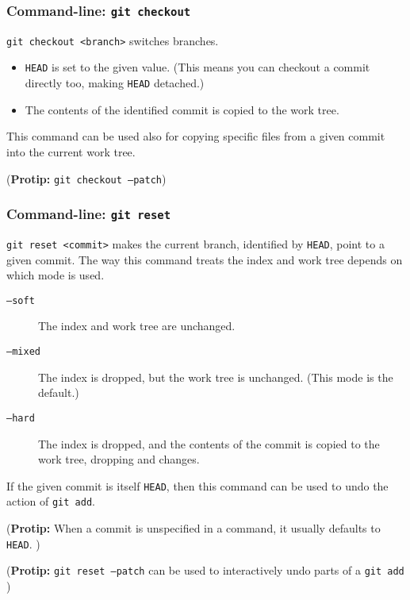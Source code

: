 \documentclass{beamer}
\newcommand{\HEAD}{\texttt{HEAD}}
\newcommand{\protip}[1]{(\textbf{Protip:} #1)}
\begin{document}
\begin{frame}
    \frametitle{Command-line: \texttt{git checkout}}

    \texttt{git checkout <branch>} switches branches.

    \begin{itemize}
        \item
            \HEAD{} is set to the given value.
            (This means you can checkout a commit directly too, making \HEAD{}
            detached.)
        \item
            The contents of the identified commit is copied to the work tree.
    \end{itemize}

    This command can be used also for copying specific files from a given
    commit into the current work tree.

    \protip{\texttt{git checkout --patch}}
\end{frame}

\begin{frame}
    \frametitle{Command-line: \texttt{git reset}}

    \texttt{git reset <commit>} makes the current branch, identified by
    \HEAD{}, point to a given commit. The way this command treats the index and
    work tree depends on which mode is used.

    \begin{description}
        \item[\texttt{--soft}]
            The index and work tree are unchanged.
        \item[\texttt{--mixed}]
            The index is dropped, but the work tree is unchanged. (This mode is
            the default.)
        \item[\texttt{--hard}]
            The index is dropped, and the contents of the commit is copied to
            the work tree, dropping and changes.
    \end{description}

    If the given commit is itself \HEAD{}, then this command can be used to
    undo the action of \texttt{git add}.

    \protip{
        When a commit is unspecified in a command, it usually defaults to
        \HEAD{}.
    }

    \protip{
        \texttt{git reset --patch} can be used to interactively undo parts of a
        \texttt{git add}
    }
\end{frame}
\end{document}
